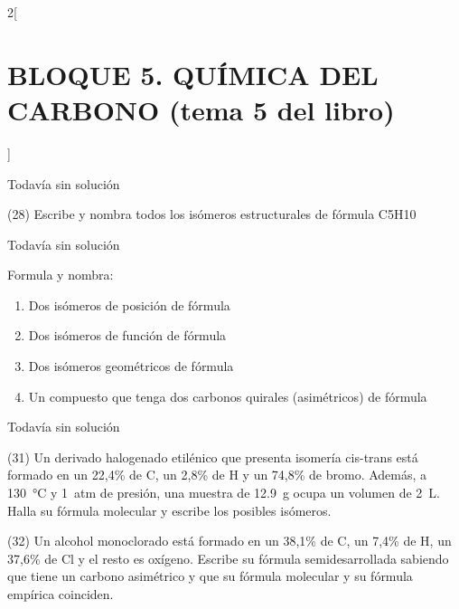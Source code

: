 \documentclass[10pt]{article}
\begin{document}
\begin{multicols}{2}[
  \section{BLOQUE 5. QUÍMICA DEL CARBONO (tema 5 del libro)}
  ]
\begin{solution}[print=false]
  Todavía sin solución
\end{solution}

\begin{exercise}
  (28) Escribe y nombra todos los isómeros estructurales de fórmula C5H10
\end{exercise}

\begin{solution}[print=false]
  Todavía sin solución
\end{solution}

\begin{exercise}
  Formula y nombra:
  \begin{enumerate}
    \item Dos isómeros de posición de fórmula 
    \item Dos isómeros de función de fórmula 
    \item Dos isómeros geométricos de fórmula 
    \item Un compuesto que tenga dos carbonos quirales (asimétricos) de fórmula 
  \end{enumerate}
\end{exercise}

\begin{solution}[print=false]
  Todavía sin solución
\end{solution}

\begin{exercise}
  (31) Un derivado halogenado etilénico que presenta isomería cis-trans
  está formado en un 22,4\% de C, un 2,8\% de H y un
  74,8\% de bromo. Además, a \SI{130}{\celsius} y \SI{1}{atm} de presión, una muestra de \SI{12,9}{\gram} ocupa un volumen de \SI{2}{\liter}. Halla su fórmula molecular y escribe los posibles isómeros.
\end{exercise}

\begin{solution}
\end{solution}

\begin{exercise}
  (32) Un alcohol monoclorado está formado en un 38,1\% de C,
  un 7,4\% de H, un 37,6\% de Cl y el resto es oxígeno. Escribe
  su fórmula semidesarrollada sabiendo que tiene un carbono
  asimétrico y que su fórmula molecular y su fórmula empírica
  coinciden.
\end{exercise}

\begin{solution}
\end{solution}


\end{multicols}
\end{document}
